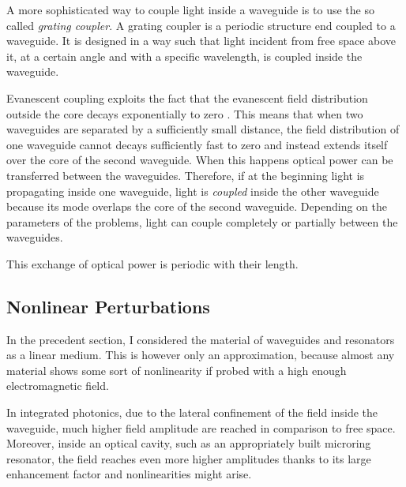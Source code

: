 A more sophisticated way to couple light inside a waveguide is to use the so called \textit{grating coupler}.
A grating coupler is a periodic structure end coupled to a waveguide.
It is designed in a way such that light incident from free space above it, at a certain angle and with a specific wavelength, is coupled inside the waveguide.

Evanescent coupling exploits the fact that the evanescent field distribution outside the core decays exponentially to zero \cite{Reed2004}.
This means that when two waveguides are separated by a sufficiently small distance, the field distribution of one waveguide cannot decays sufficiently fast to zero and instead extends itself over the core of the second waveguide.
When this happens optical power can be transferred between the waveguides.
Therefore, if at the beginning light is propagating inside one waveguide, light is \textit{coupled} inside the other waveguide because its mode overlaps the core of the second waveguide.
Depending on the parameters of the problems, light can couple completely or partially between the waveguides.

This exchange of optical power is periodic with their length.

\subsection{Nonlinear Perturbations}
\label{ssec:Nonlinear_Perturbations}
In the precedent section, I considered the material of waveguides and resonators as a linear medium.
This is however only an approximation, because almost any material shows some sort of nonlinearity if probed with a high enough electromagnetic field.

In integrated photonics, due to the lateral confinement of the field inside the waveguide, much higher field amplitude are reached in comparison to free space.
Moreover, inside an optical cavity, such as an appropriately built microring resonator, the field reaches even more higher amplitudes thanks to its large enhancement factor and nonlinearities might arise.

